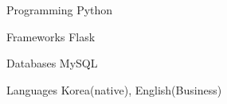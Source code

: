 

\begin{cvskills}

  \cvskill
    {Programming} %
    {Python} %

  \cvskill
    {Frameworks} %
    {Flask} %

  \cvskill
    {Databases} %
    {MySQL} %

  \cvskill
    {Languages} %
    {Korea(native), English(Business)} %

\end{cvskills}

